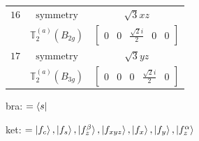 \documentclass[fleqn,8pt,landscape]{jsarticle}
\begin{document}
\begin{longtable}{ccc}
$ 16 $ & $ \text{symmetry} $ & $ \sqrt{3} x z $ \\
$  $ & $ \mathbb{T}_{2}^{(a)}(B_{2g}) $ & $ \begin{bmatrix} 0 & 0 & \frac{\sqrt{2} i}{2} & 0 & 0 \end{bmatrix} $ \\ \hline
$ 17 $ & $ \text{symmetry} $ & $ \sqrt{3} y z $ \\
$  $ & $ \mathbb{T}_{2}^{(a)}(B_{3g}) $ & $ \begin{bmatrix} 0 & 0 & 0 & \frac{\sqrt{2} i}{2} & 0 \end{bmatrix} $ \\ \hline
\end{longtable}
bra: $=\bra{s}$

\noindent
ket: $=\ket{f_{c}}, \ket{f_{s}}, \ket{f_{z}^{\beta}}, \ket{f_{xyz}}, \ket{f_{x}}, \ket{f_{y}}, \ket{f_{z}^{\alpha}}$
\renewcommand{\arraystretch}{1.6}
\end{document}
